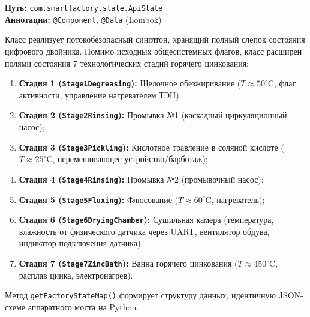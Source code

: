 \documentclass[14pt, a4paper]{extarticle}
\begin{document}
\textbf{Путь:} \texttt{com.smartfactory.state.ApiState}\\
\textbf{Аннотации:} \texttt{@Component}, \texttt{@Data} (Lombok)

Класс реализует потокобезопасный синглтон, хранящий полный слепок состояния цифрового двойника. Помимо исходных общесистемных флагов, класс расширен полями состояния 7 технологических стадий горячего цинкования:

\begin{enumerate}
    \item \textbf{Стадия 1 (\texttt{Stage1Degreasing}):} Щелочное обезжиривание ($T \approx 50^\circ\text{C}$, флаг активности, управление нагревателем ТЭН);
    \item \textbf{Стадия 2 (\texttt{Stage2Rinsing}):} Промывка №1 (каскадный циркуляционный насос);
    \item \textbf{Стадия 3 (\texttt{Stage3Pickling}):} Кислотное травление в соляной кислоте ($T \approx 25^\circ\text{C}$, перемешивающее устройство/барботаж);
    \item \textbf{Стадия 4 (\texttt{Stage4Rinsing}):} Промывка №2 (промывочный насос);
    \item \textbf{Стадия 5 (\texttt{Stage5Fluxing}):} Флюсование ($T \approx 60^\circ\text{C}$, нагреватель);
    \item \textbf{Стадия 6 (\texttt{Stage6DryingChamber}):} Сушильная камера (температура, влажность от физического датчика через UART, вентилятор обдува, индикатор подключения датчика);
    \item \textbf{Стадия 7 (\texttt{Stage7ZincBath}):} Ванна горячего цинкования ($T \approx 450^\circ\text{C}$, расплав цинка, электронагрев).
\end{enumerate}

Метод \texttt{getFactoryStateMap()} формирует структуру данных, идентичную JSON-схеме аппаратного моста на Python.
\end{document}
